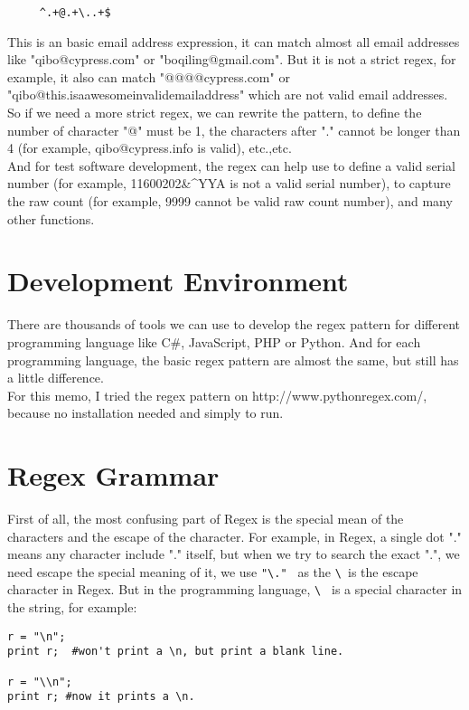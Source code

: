 \begin{lstlisting}
	 ^.+@.+\..+$
\end{lstlisting}

This is an basic email address expression, it can match almost all email addresses like "qibo@cypress.com" or "boqiling@gmail.com". But it is not a strict regex, for example, it also can match "@@@@cypress.com" or "qibo@this.isaawesomeinvalidemailaddress" which are not valid email addresses. So if we need a more strict regex, we can rewrite the pattern, to define the number of character "@" must be 1, the characters after "." cannot be longer than 4 (for example, qibo@cypress.info is valid), etc.,etc.\\
And for test software development, the regex can help use to define a valid serial number (for example, 11600202\&\^\*YYA is not a valid serial number), to capture the raw count (for example, 9999 cannot be valid raw count number), and many other functions. 

\section{Development Environment}

There are thousands of tools we can use to develop the regex pattern for different programming language like C\#, JavaScript, PHP or Python. And for each programming language, the basic regex pattern are almost the same, but still has a little difference. \\
For this memo, I tried the regex pattern on http://www.pythonregex.com/, because no installation needed and simply to run.

\section{Regex Grammar}

First of all, the most confusing part of Regex is the special mean of the characters and the escape of the character. For example, in Regex, a single dot "." means any character include "." itself, but when we try to search the exact ".", we need escape the special meaning of it, we use \verb/"\." / as the \verb/\ /is the escape character in Regex. But in the programming language, \verb/\ / is a special character in the string, for example:

\begin{lstlisting}
r = "\n";
print r;  #won't print a \n, but print a blank line.

r = "\\n";
print r; #now it prints a \n.
\end{lstlisting} 

